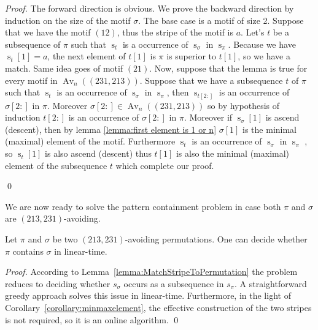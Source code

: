 \documentclass[a4paper]{llncs}
\DeclareMathOperator{\AV}{Av}
\DeclareMathOperator{\Avd}{Av}
\newcommand\Av[2]{\Avd_{{#1}}({#2})}
\newcommand{\ptext}{\pi}
\newcommand{\pmotif}{\sigma}
\DeclareMathOperator{\stripea}{s}
\newcommand{\stripe}[2]{\stripea_{{#1}}[{#2}]}
\newcommand{\stripew}[1]{\stripea_{{#1}}}
\newcommand{\ustep}{a}
\begin{document}
\begin{proof} 
	The forward direction is obvious.
	We prove the backward direction by induction on the size of the motif
	$\sigma$.
	The base case is a motif of size 2. Suppose that we have the motif $(12)$, thus the stripe of the motif is $\ustep$. Let's $t$ be a subsequence of $\ptext$ such that $\stripew{t}$ is a occurrence of $\stripew{\pmotif}$ in $\stripew{\ptext}$. Because we have $\stripe{t}{1}=\ustep$, the next element of $t[1]$ is $\ptext$ is superior to  $t[1]$, so we have a match. Same idea goes of motif $(21)$.
	Now, suppose that the lemma is true for every motif in $\Av{n}{(231,213)}$. Suppose that we have a subsequence $t$ of $\ptext$ such that $\stripew{t}$ is an occurrence of $\stripew{\pmotif}$ in $\stripew{\ptext}$, then $\stripew{t[2:]}$ is an occurrence of $\pmotif[2:]$ in $\ptext$. Moreover
	$\pmotif[2:] \in \Av{n}{(231,213)}$ so by hypothesis of induction $t[2:]$ is an occurrence of $\sigma[2:]$ in $\ptext$.
	Moreover if $\stripe{\pmotif}{1}$ is ascend (descent), then by lemma \ref{lemma:first element is 1 or n} $\pmotif[1]$ is the minimal (maximal) element of the motif. Furthermore $\stripew{t}$ is an occurrence of $\stripew{\pmotif}$ in $\stripew{\ptext}$ , so $\stripe{t}{1}$ is also ascend (descent) thus $t[1]$ is also the minimal (maximal) element of the subsequence $t$ which complete our proof.	


\qed
\end{proof}	 

We are now ready to solve the pattern containment problem in case
both $\pi$ and $\sigma$ are $(213, 231)$-avoiding.

\begin{proposition}
	Let $\pi$ and $\sigma$ be two $(213,231)$-avoiding permutations.
	One can decide whether $\pi$ contains $\sigma$ in linear-time.
\end{proposition}

\begin{proof}
According to Lemma~\ref{lemma:MatchStripeToPermutation} the problem reduces 
to deciding whether $s_\sigma$ occurs as a subsequence in $s_\pi$. 
A straightforward greedy approach solves this issue in linear-time. 
Furthermore, in the light of Corollary~\ref{corollary:minmaxelement}, 
the effective construction of the two stripes is not required, 
so it is an online algorithm.
\qed
\end{proof}	
\end{document}
